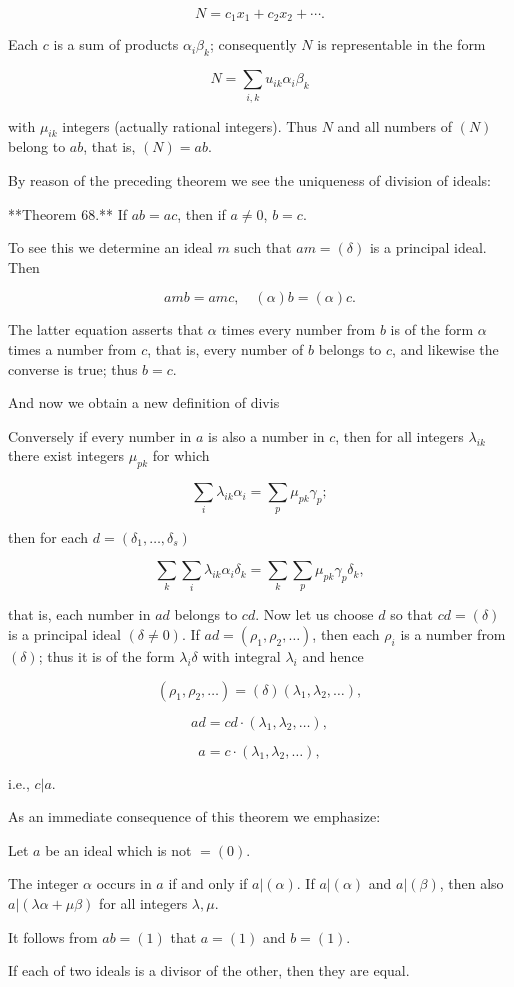 $$N = c_1 x_1 + c_2 x_2 + \cdots.$$

Each $c$ is a sum of products $\alpha_i \beta_k$; consequently $N$ is representable in the form

$$N = \sum_{i,k} u_{ik} \alpha_i \beta_k$$

with $\mu_{ik}$ integers (actually rational integers). Thus $N$ and all numbers of $(N)$ belong to $ab$, that is, $(N) = ab$.

By reason of the preceding theorem we see the uniqueness of division of ideals:

**Theorem 68.** If $ab = ac$, then if $a \neq 0$, $b = c$.

To see this we determine an ideal $m$ such that $am = (\delta)$ is a principal ideal. Then

$$amb = amc, \quad (\alpha)b = (\alpha)c.$$

The latter equation asserts that $\alpha$ times every number from $b$ is of the form $\alpha$ times a number from $c$, that is, every number of $b$ belongs to $c$, and likewise the converse is true; thus $b = c$.

And now we obtain a new definition of divis

Conversely if every number in $a$ is also a number in $c$, then for all integers $\lambda_{ik}$ there exist integers $\mu_{pk}$ for which

$$\sum_i \lambda_{ik} \alpha_i = \sum_p \mu_{pk} \gamma_p;$$

then for each $d = (\delta_1, \ldots, \delta_s)$

$$\sum_k \sum_i \lambda_{ik} \alpha_i \delta_k = \sum_k \sum_p \mu_{pk} \gamma_p \delta_k,$$

that is, each number in $a d$ belongs to $c d$. Now let us choose $d$ so that $c d = (\delta)$ is a principal ideal $(\delta \neq 0)$. If $a d = (\rho_1, \rho_2, \ldots)$, then each $\rho_i$ is a number from $(\delta)$; thus it is of the form $\lambda_i \delta$ with integral $\lambda_i$ and hence

$$(\rho_1, \rho_2, \ldots) = (\delta)(\lambda_1, \lambda_2, \ldots),$$

$$a d = c d \cdot (\lambda_1, \lambda_2, \ldots),$$

$$a = c \cdot (\lambda_1, \lambda_2, \ldots),$$

i.e., $c | a$.

As an immediate consequence of this theorem we emphasize:

Let $a$ be an ideal which is not $= (0)$.

The integer $\alpha$ occurs in $a$ if and only if $a | (\alpha)$. If $a | (\alpha)$ and $a | (\beta)$, then also $a | (\lambda \alpha + \mu \beta)$ for all integers $\lambda, \mu$.

It follows from $a b = (1)$ that $a = (1)$ and $b = (1)$.

If each of two ideals is a divisor of the other, then they are equal.
